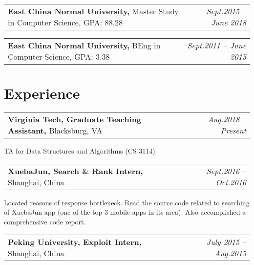 \documentclass[a4paper,10pt]{article}
\newenvironment{packed_itemize}{
\begin{list}{\labelitemi}{\leftmargin=2em}
\setlength{\itemsep}{0pt}
\setlength{\parskip}{0pt}
\setlength{\parsep}{0pt}
\setlength{\headsep}{0pt}
\setlength{\topskip}{0pt}
\setlength{\topmargin}{0pt}
\setlength{\topsep}{0pt}
\setlength{\partopsep}{0pt}
}{\end{list}}
\begin{document}
\begin{tabular}{p{15cm}r}
\textbf{East China Normal University,} Master Study in Computer Science, GPA: 88.28 & \emph{Sept.2015 – June 2018} \\
\end{tabular}

\begin{tabular}{p{15cm}r}
\textbf{East China Normal University,} BEng in Computer Science, GPA: 3.38 & \emph{Sept.2011 – June 2015} \\
\end{tabular}
\vspace{-1em}


\vspace{-0.2cm}
\section{Experience}
\vspace{-0.2cm}

\begin{tabular}{p{15cm}r}
\textbf{Virginia Tech, Graduate Teaching Assistant,} Blacksburg, VA  & \emph{Aug.2018 – Present} \\
\end{tabular}

\begin{packed_itemize}
\item TA for Data Structures and Algorithms (CS 3114)
\end{packed_itemize}



\begin{tabular}{p{15cm}r}
\textbf{XuebaJun, Search \& Rank Intern,} Shanghai, China & \emph{Sept.2016 – Oct.2016} \\
\end{tabular}

\begin{packed_itemize}
\item Located reasons of response bottleneck. Read the source code related to searching of XuebaJun
app (one of the top 3 mobile apps in its area). Also accomplished a comprehensive code report.
\end{packed_itemize}

\begin{tabular}{p{15cm}r}
\textbf{Peking University, Exploit Intern,} Shanghai, China & \emph{July 2015 – Aug.2015} \\
\end{tabular}
\end{document}
